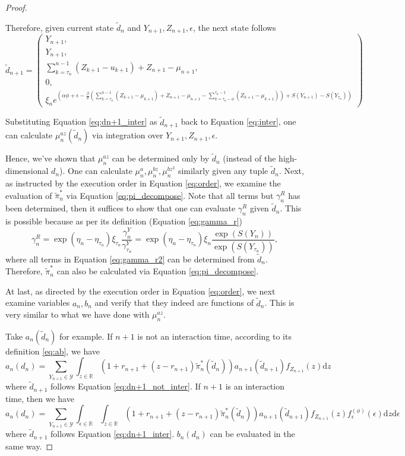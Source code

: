 \begin{proof}
\begin{enumerate}
    Therefore, given current state $\tilde d_n$ and $Y_{n+1}, Z_{n+1}, \epsilon$, the next state follows \begin{equation}
    \label{eq:dn+1_inter}
        \tilde d_{n+1}=\begin{pmatrix}Y_{n+1},\\
        Y_{n+1},\\
        \sum_{k=\tau_n}^{n-1}(Z_{k+1}-u_{k+1})+Z_{n+1}-\mu_{n+1},\\
        0,\\
        \xi_{n}e^{\left(\alpha\phi+\epsilon-\frac{\beta}{\phi}\left(\sum_{k=\tau_n}^{n-1}(Z_{k+1}-\mu_{k+1})+Z_{n+1}-\mu_{n+1}-\sum_{k=\tau_n-\phi}^{\tau_n-1}(Z_{k+1}-\mu_{k+1})\right)+S(Y_{n+1})-S(Y_{\tau_n})\right)}
    \end{pmatrix}
    \end{equation}
    
    Substituting Equation \eqref{eq:dn+1_inter} as $\tilde d_{n+1}$ back to Equation \eqref{eq:inter}, one can calculate $\mu_{n}^{az}(\tilde d_n)$ via integration over $Y_{n+1},Z_{n+1},\epsilon$.
\end{enumerate}

Hence, we've shown that $\mu_n^{az}$ can be determined only by $\tilde d_n$ (instead of the high-dimensional $d_n$). One can calculate $\mu_n^a,\mu_n^{bz},\mu_n^{bz^2}$ similarly given any tuple $\tilde d_n$. Next, as instructed by the execution order in Equation \eqref{eq:order}, we examine the evaluation of $\tilde\pi_n^*$ via Equation \eqref{eq:pi_decompose}. Note that all terms but $\gamma_n^R$ has been determined, then it suffices to show that one can evaluate $\gamma_n^R$ given $\tilde d_n$. This is possible because as per its definition (Equation \eqref{eq:gamma_r})\begin{equation}\label{eq:gamma_r2}
    \gamma_n^R=\exp(\eta_n-\eta_{\tau_n})\xi_{\tau_n}\frac{\gamma_n^Y}{\gamma_{\tau_n}^Y}=\exp(\eta_n-\eta_{\tau_n})\xi_n\frac{\exp(S(Y_n))}{\exp(S(Y_{\tau_n}))},
\end{equation} where all terms in Equation \eqref{eq:gamma_r2} can be determined from $\tilde d_n$. Therefore, $\tilde\pi_n^*$ can also be calculated via Equation \eqref{eq:pi_decompose}.

At last, as directed by the execution order in Equation \eqref{eq:order}, we next examine variables $a_n,b_n$ and verify that they indeed are functions of $\tilde d_n$. This is very similar to what we have done with $\mu_n^{az}$.

Take $a_n(\tilde d_n)$ for example. If $n+1$ is not an interaction time, according to its definition \eqref{eq:ab}, we have $$
a_n(d_n)=\sum_{Y_{n+1}\in\mathcal Y}\int_{z\in\mathbb R} (1+r_{n+1}+(z-r_{n+1})\tilde\pi^*_n(\tilde d_n))a_{n+1}(\tilde d_{n+1}) f_{Z_{n+1}}(z)\mathrm dz
$$ where $\tilde d_{n+1}$ follows Equation \eqref{eq:dn+1_not_inter}. If $n+1$ is an interaction time, then we have $$
a_n(d_n)=\sum_{Y_{n+1}\in\mathcal Y}\int_{\epsilon\in\mathbb R}\int_{z\in\mathbb R} (1+r_{n+1}+(z-r_{n+1})\tilde\pi^*_n(\tilde d_n))a_{n+1}(\tilde d_{n+1}) f_{Z_{n+1}}(z) f_\epsilon^{(\phi)}(\epsilon)\mathrm dz\mathrm d\epsilon
$$ where $\tilde d_{n+1}$ follows Equation \eqref{eq:dn+1_inter}. $b_n(d_n)$ can be evaluated in the same way.


\end{proof}
